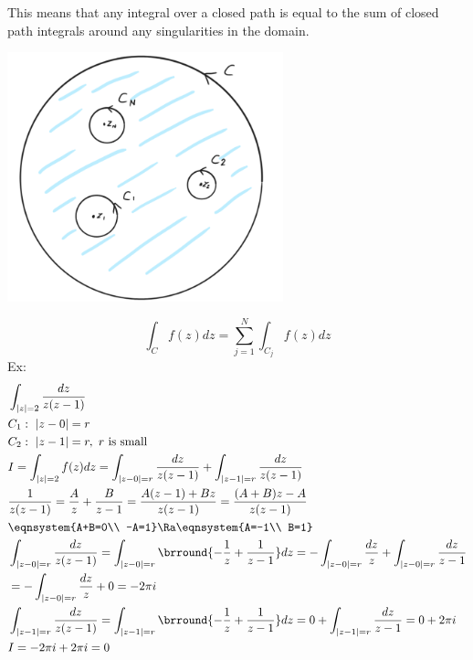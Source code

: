 This means that any integral over a closed path is equal to the sum of closed path integrals around any singularities in the domain.\\
\centerline{\includegraphics[width=0.6\textwidth]{Images/ComplexAnalysisPictures/MultipleSingularities.png}}
\[\int_Cf(z)dz=\sum_{j=1}^N\int_{C_j}f(z)dz\]
Ex:
\begin{align*}
    &\int_{|z|=2}\frac{dz}{z(z-1)}\\
    &C_1:\ |z-0|=r\\
    &C_2:\ |z-1|=r,\ \text{$r$ is small}\\
    &I=\int_{|z|=2}f(z)dz=\int_{|z-0|=r}\frac{dz}{z(z-1)}+\int_{|z-1|=r}\frac{dz}{z(z-1)}\\
    &\frac{1}{z(z-1)}=\frac{A}{z}+\frac{B}{z-1}=\frac{A(z-1)+Bz}{z(z-1)}=\frac{(A+B)z-A}{z(z-1)}\\
    &\eqnsystem{A+B=0\\ -A=1}\Ra\eqnsystem{A=-1\\ B=1}\\
    &\int_{|z-0|=r}\frac{dz}{z(z-1)}=\int_{|z-0|=r}\brround{-\frac{1}{z}+\frac{1}{z-1}}dz=-\int_{|z-0|=r}\frac{dz}{z}+\int_{|z-0|=r}\frac{dz}{z-1}\\
    &=-\int_{|z-0|=r}\frac{dz}{z}+0=-2\pi i\\
    &\int_{|z-1|=r}\frac{dz}{z(z-1)}=\int_{|z-1|=r}\brround{-\frac{1}{z}+\frac{1}{z-1}}dz=0+\int_{|z-1|=r}\frac{dz}{z-1}=0+2\pi i\\
    &I=-2\pi i+2\pi i=0
\end{align*}
